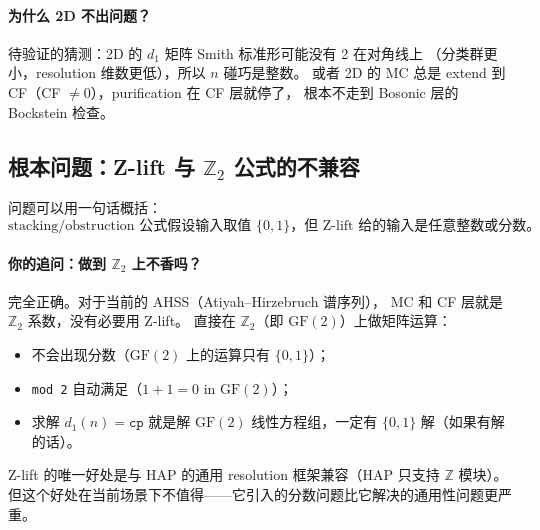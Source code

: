 \documentclass[a4paper,fontset=ubuntu,12pt]{ctexart}
\begin{document}
\paragraph{为什么 2D 不出问题？}
待验证的猜测：2D 的 $d_1$ 矩阵 Smith 标准形可能没有 2 在对角线上
（分类群更小，resolution 维数更低），所以 $n$ 碰巧是整数。
或者 2D 的 MC 总是 extend 到 CF（CF $\neq 0$），purification 在 CF 层就停了，
根本不走到 Bosonic 层的 Bockstein 检查。

\subsection{根本问题：Z-lift 与 $\mathbb{Z}_2$ 公式的不兼容}
\label{sec:zlift-incompatibility}

问题可以用一句话概括：
\begin{equation}
\boxed{\text{stacking/obstruction 公式假设输入取值 $\{0,1\}$，但 Z-lift 给的输入是任意整数或分数。}}
\label{eq:zlift-incompatibility}
\end{equation}

\paragraph{你的追问：做到 $\mathbb{Z}_2$ 上不香吗？}
完全正确。对于当前的 AHSS（Atiyah--Hirzebruch 谱序列），
MC 和 CF 层就是 $\mathbb{Z}_2$ 系数，没有必要用 Z-lift。
直接在 $\mathbb{Z}_2$（即 $\mathrm{GF}(2)$）上做矩阵运算：
\begin{itemize}
\item 不会出现分数（$\mathrm{GF}(2)$ 上的运算只有 $\{0, 1\}$）；
\item \texttt{mod 2} 自动满足（$1 + 1 = 0$ in $\mathrm{GF}(2)$）；
\item 求解 $d_1(n) = \texttt{cp}$ 就是解 $\mathrm{GF}(2)$ 线性方程组，一定有 $\{0, 1\}$ 解（如果有解的话）。
\end{itemize}

Z-lift 的唯一好处是与 HAP 的通用 resolution 框架兼容（HAP 只支持 $\mathbb{Z}$ 模块）。
但这个好处在当前场景下不值得——它引入的分数问题比它解决的通用性问题更严重。
\end{document}
